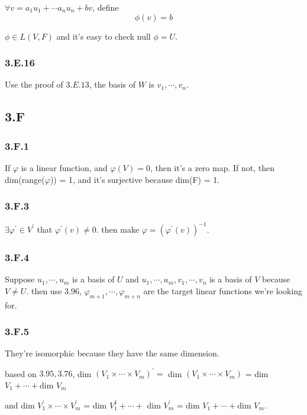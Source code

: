$\forall v = a_{1}u_{1}+\cdots a_{n}u_{n} + bv$, define 
\[\phi(v) = b\]

$\phi \in L(V, F)$ and it's easy to check  null $\phi = U$.

\subsubsection*{3.E.16}

Use the proof of $3.E.13$, the basis of $W$ is $v_{1}, \cdots, v_{n}$.

\subsection*{3.F}
\subsubsection*{3.F.1}

If $\varphi$ is a linear function, and $\varphi(V) = {0} $, then it's a zero map. If not, then dim(range($\varphi$)) = 1, and it's surjective because dim(F) = 1.

\subsubsection*{3.F.3}

$\exists \varphi^{'} \in V^{'}$ that $\varphi^{'}(v) \neq 0$. then make $\varphi = (\varphi^{'}(v))^{-1}$.

\subsubsection*{3.F.4}

Suppose $u_{1}, \cdots, u_{m}$ is a basis of $U$ and $u_{1}, \cdots, u_{m}, v_{1},\cdots, v_{n}$ is a basis of $V$ because $V\neq U$. then use $3.96$, $\varphi_{m+1},\cdots,\varphi_{m+n}$ are the target linear functions we're looking for.

\subsubsection*{3.F.5}

They're isomorphic because they have the same dimension.

based on $3.95, 3.76$, dim $(V_{1}\times \cdots \times V_{m})^{'} = $ dim $(V_{1}\times \cdots \times V_{m})$ = dim $V_{1} + \cdots + $dim $V_{m}$

and dim $V_{1}^{'}\times \cdots \times V_{m}^{'}$ = dim $V_{1}^{1}+\cdots +$ dim $V_{m}^{'}$ = dim $V_{1} + \cdots + $dim $V_{m}$.

